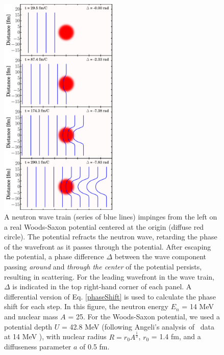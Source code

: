 \begin{figure}
    \includegraphics[width=0.5\textwidth]{figures/phaseShiftStillsFigure.png}
    \caption[A illustration of the nuclear Ramsauer effect]{
        A neutron wave train (series of
        blue lines) impinges from the left on a real Woods-Saxon
        potential centered at the origin (diffuse red circle). The potential
        refracts the neutron wave,
        retarding the phase of the wavefront as it passes through the
        potential. After escaping the potential, a phase difference $\Delta$ between
        the wave component passing \textit{around} and \textit{through the center}
        of the potential persists, resulting in scattering.
        For the leading wavefront in the wave train, $\Delta$ is indicated in
        the top right-hand corner of each panel. A differential version of
        Eq. \ref{phaseShift} is used to
        calculate the phase shift for each step. In this figure, the neutron
        energy $E_{n}$ = 14 MeV and nuclear mass $A$ = 25. For the Woods-Saxon potential,
        we used a potential depth $U$ = 42.8 MeV (following Angeli's analysis
        of \tot\ data at 14 MeV \cite{Angeli1970}), with nuclear radius $R = 
        r_{0}A^{\frac{1}{3}}$, $r_{0}$ = 1.4 fm, and a diffuseness parameter
        $a$ of 0.5 fm.
    }
    \label{RamsauerPhaseShiftFigure}
\end{figure}

